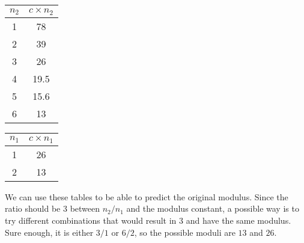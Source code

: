 \begin{enumerate}
\begin{center}
\begin{tabular}{|cc|}
\hline
$n_2$ & $c\times n_2$\\
\hline
1& 78 \\
2 & 39\\
3 & 26 \\
4 & 19.5 \\
5 & 15.6 \\
6 & 13 \\
\hline
\end{tabular}
\quad
\begin{tabular}{|cc|}
\hline
$n_1$ & $c\times n_1$\\
\hline
1 & 26\\
2 & 13 \\
\hline
\end{tabular}
\end{center}
We can use these tables to be able to predict the original modulus. Since the ratio should be $3$ between $n_2/n_1$ and the modulus constant, a possible way is to try different combinations that would result in $3$ and have the same modulus. Sure enough, it is either $3/1$ or $6/2$, so the possible moduli are $13$ and $26$.

\end{enumerate}